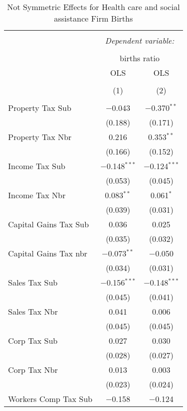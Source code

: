 
\begin{table}[!htbp] \centering 
  \caption{Not Symmetric Effects for  Health care and social assistance Firm Births} 
  \label{62noequality} 
\begin{tabular}{@{\extracolsep{5pt}}lcc} 
\\[-1.8ex]\hline 
\hline \\[-1.8ex] 
 & \multicolumn{2}{c}{\textit{Dependent variable:}} \\ 
\cline{2-3} 
\\[-1.8ex] & \multicolumn{2}{c}{births ratio} \\ 
 & OLS & OLS \\ 
\\[-1.8ex] & (1) & (2)\\ 
\hline \\[-1.8ex] 
 Property Tax Sub & $-$0.043 & $-$0.370$^{**}$ \\ 
  & (0.188) & (0.171) \\ 
  Property Tax Nbr & 0.216 & 0.353$^{**}$ \\ 
  & (0.166) & (0.152) \\ 
  Income Tax Sub & $-$0.148$^{***}$ & $-$0.124$^{***}$ \\ 
  & (0.053) & (0.045) \\ 
  Income Tax Nbr & 0.083$^{**}$ & 0.061$^{*}$ \\ 
  & (0.039) & (0.031) \\ 
  Capital Gains Tax Sub & 0.036 & 0.025 \\ 
  & (0.035) & (0.032) \\ 
  Capital Gains Tax nbr & $-$0.073$^{**}$ & $-$0.050 \\ 
  & (0.034) & (0.031) \\ 
  Sales Tax Sub & $-$0.156$^{***}$ & $-$0.148$^{***}$ \\ 
  & (0.045) & (0.041) \\ 
  Sales Tax Nbr & 0.041 & 0.006 \\ 
  & (0.045) & (0.045) \\ 
  Corp Tax Sub & 0.027 & 0.030 \\ 
  & (0.028) & (0.027) \\ 
  Corp Tax Nbr & 0.013 & 0.003 \\ 
  & (0.023) & (0.024) \\ 
  Workers Comp Tax Sub & $-$0.158 & $-$0.124 \\ 

\end{tabular}
\end{table}
